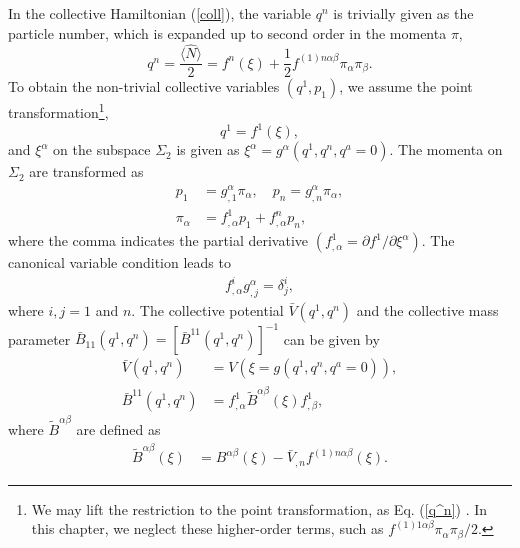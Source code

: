 \documentclass[11pt]{book} %
\begin{document}
In the collective Hamiltonian (\ref{coll}), the variable $q^n$ is
trivially given as the particle number, which is expanded up to
second order in the momenta $\pi$,
\begin{equation}
q^n=\frac{\langle \hat{N} \rangle}{2} = f^n(\xi)
	+\frac{1}{2}f^{(1)n\alpha\beta}\pi_\alpha\pi_\beta .
	\label{q^n}
\end{equation}
To obtain the non-trivial collective variables
$(q^1,p_1)$, we assume the point transformation\footnote{
We may lift the restriction to the point transformation,
as Eq. (\ref{q^n}) \cite{Sat18}.
In this chapter, we neglect these higher-order terms, such as
$f^{(1)1\alpha\beta}\pi_\alpha\pi_\beta/2$.
},
\begin{equation}
  q^1 = f^1(\xi) \label{point} ,
\end{equation}
and $\xi^\alpha$ on the subspace $\Sigma_2$ is given as
$\xi^{\alpha} = g^{\alpha}(q^1,q^n,q^a=0)$.
The momenta on $\Sigma_2$ are transformed as
\begin{align}
p_1 &= g_{,1}^{\alpha}\pi_{\alpha} , \quad p_n = g_{,n}^\alpha \pi_\alpha,
	\label{coll_momenta}\\
\pi_{\alpha} &= f^1_{,\alpha}p_1 +f^n_{,\alpha}p_n,
 \label{momenta2}
\end{align}
where the comma indicates the partial derivative
$(f^1_{,\alpha}=\partial f^1/\partial \xi^{\alpha})$. 
The canonical variable condition leads to
\begin{align}
f^i_{,\alpha}g_{,j}^{\alpha} = \delta^i_j,
  \label{canonicity}
\end{align}
where $i,j=1$ and $n$.
The collective potential $\bar{V}(q^1,q^n)$ and
the collective mass parameter
$\bar{B}_{11}(q^1,q^n)=[\bar{B}^{11}(q^1,q^n)]^{-1}$ can be given by
\begin{align}
\bar{V}(q^1,q^n) &= V(\xi=g(q^1,q^n,q^a=0)), \\
\bar{B}^{11}(q^1,q^n) &= f^1_{,\alpha}\tilde{B}^{\alpha\beta}(\xi)f^1_{,\beta} ,
  \label{coll_mass}
\end{align}
where $\tilde{B}^{\alpha\beta}$ are defined as
\begin{align}
 \tilde{B}^{\alpha\beta}(\xi)
&= B^{\alpha\beta}(\xi) - \bar{V}_{,n} f^{(1)n\alpha\beta}(\xi)
\label{tildeB}.
\end{align} 
\end{document}
